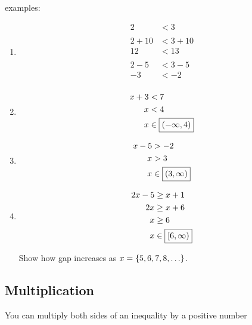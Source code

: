 \documentclass[letterpaper, landscape]{exam}
\begin{document}
  examples:
  \begin{enumerate}
    \item 
      \begin{align*}
        2 & < 3 \\
        \\
        2 + 10 & < 3 + 10 \\
        12     & < 13 \\
        \\
        2 - 5 & < 3 - 5 \\
        -3    & < -2 \\
      \end{align*}

    \item 
      \begin{align*}
        x + 3 & < 7 \\
        x     & < 4 \\
        x     & \in \boxed{ \intoo{ -\infty, 4 } } \\
      \end{align*}

    \item 
      \begin{align*}
        x - 5 & > -2 \\
        x     & > 3 \\
        x     & \in \boxed{ \intoo{ 3, \infty } } \\
      \end{align*}

    \item 
      \begin{align*}
        2x - 5 & \geq x + 1 \\
        2x     & \geq x + 6 \\
        x      & \geq 6 \\
        x      & \in \boxed{ \intco{ 6, \infty } } \\
      \end{align*}

      Show how gap increases as $x = \cbr{ 5, 6, 7, 8, \ldots}$.

  \end{enumerate}

  \subsection{Multiplication} %

  You can multiply both sides of an inequality by a positive number 
\end{document}

